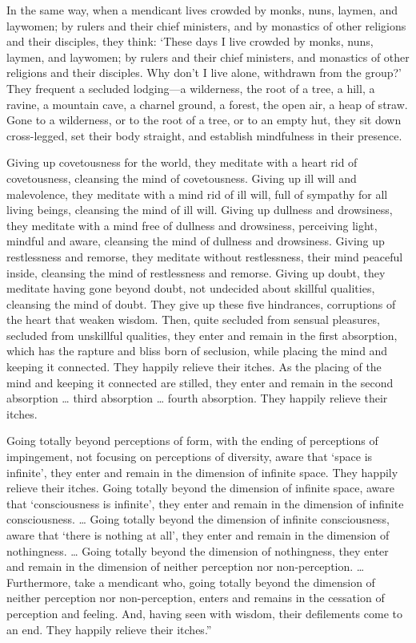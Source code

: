 \documentclass[12pt,openany]{book}%
\begin{document}
In the same way, when a mendicant lives crowded by monks, nuns, laymen, and laywomen; by rulers and their chief ministers, and by monastics of other religions and their disciples, they think: ‘These days I live crowded by monks, nuns, laymen, and laywomen; by rulers and their chief ministers, and monastics of other religions and their disciples. Why don’t I live alone, withdrawn from the group?’ They frequent a secluded lodging—a wilderness, the root of a tree, a hill, a ravine, a mountain cave, a charnel ground, a forest, the open air, a heap of straw. Gone to a wilderness, or to the root of a tree, or to an empty hut, they sit down cross-legged, set their body straight, and establish mindfulness in their presence. 

Giving up covetousness for the world, they meditate with a heart rid of covetousness, cleansing the mind of covetousness. Giving up ill will and malevolence, they meditate with a mind rid of ill will, full of sympathy for all living beings, cleansing the mind of ill will. Giving up dullness and drowsiness, they meditate with a mind free of dullness and drowsiness, perceiving light, mindful and aware, cleansing the mind of dullness and drowsiness. Giving up restlessness and remorse, they meditate without restlessness, their mind peaceful inside, cleansing the mind of restlessness and remorse. Giving up doubt, they meditate having gone beyond doubt, not undecided about skillful qualities, cleansing the mind of doubt. They give up these five hindrances, corruptions of the heart that weaken wisdom. Then, quite secluded from sensual pleasures, secluded from unskillful qualities, they enter and remain in the first absorption, which has the rapture and bliss born of seclusion, while placing the mind and keeping it connected. They happily relieve their itches. As the placing of the mind and keeping it connected are stilled, they enter and remain in the second absorption … third absorption … fourth absorption. They happily relieve their itches. 

Going totally beyond perceptions of form, with the ending of perceptions of impingement, not focusing on perceptions of diversity, aware that ‘space is infinite’, they enter and remain in the dimension of infinite space. They happily relieve their itches. Going totally beyond the dimension of infinite space, aware that ‘consciousness is infinite’, they enter and remain in the dimension of infinite consciousness. … Going totally beyond the dimension of infinite consciousness, aware that ‘there is nothing at all’, they enter and remain in the dimension of nothingness. … Going totally beyond the dimension of nothingness, they enter and remain in the dimension of neither perception nor non-perception. … Furthermore, take a mendicant who, going totally beyond the dimension of neither perception nor non-perception, enters and remains in the cessation of perception and feeling. And, having seen with wisdom, their defilements come to an end. They happily relieve their itches.” 
\end{document}
